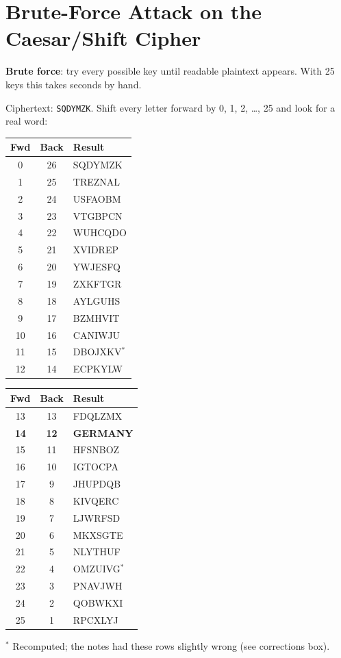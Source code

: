 \documentclass[10pt,a4paper]{article}
\newcommand{\ttx}[1]{\texttt{#1}}
\begin{document}
\section{Brute-Force Attack on the Caesar/Shift Cipher}

\begin{keybox}
\textbf{Brute force}: try every possible key until readable plaintext appears. With 25 keys this takes seconds by hand.
\end{keybox}

Ciphertext: \ttx{SQDYMZK}. Shift every letter forward by 0, 1, 2, \dots, 25 and look for a real word:

\begin{center}\small\ttfamily\setlength{\tabcolsep}{6pt}
\begin{tabular}{@{}ccl@{}}
\toprule
\rmfamily\bfseries Fwd & \rmfamily\bfseries Back & \rmfamily\bfseries Result\\
\midrule
0 & 26 & SQDYMZK\\
1 & 25 & TREZNAL\\
2 & 24 & USFAOBM\\
3 & 23 & VTGBPCN\\
4 & 22 & WUHCQDO\\
5 & 21 & XVIDREP\\
6 & 20 & YWJESFQ\\
7 & 19 & ZXKFTGR\\
8 & 18 & AYLGUHS\\
9 & 17 & BZMHVIT\\
10 & 16 & CANIWJU\\
11 & 15 & DBOJXKV$^\ast$\\
12 & 14 & ECPKYLW\\
\bottomrule
\end{tabular}
\qquad
\begin{tabular}{@{}ccl@{}}
\toprule
\rmfamily\bfseries Fwd & \rmfamily\bfseries Back & \rmfamily\bfseries Result\\
\midrule
13 & 13 & FDQLZMX\\
\rowcolor{warn!18} \textbf{14} & \textbf{12} & \textbf{GERMANY}\\
15 & 11 & HFSNBOZ\\
16 & 10 & IGTOCPA\\
17 & 9 & JHUPDQB\\
18 & 8 & KIVQERC\\
19 & 7 & LJWRFSD\\
20 & 6 & MKXSGTE\\
21 & 5 & NLYTHUF\\
22 & 4 & OMZUIVG$^\ast$\\
23 & 3 & PNAVJWH\\
24 & 2 & QOBWKXI\\
25 & 1 & RPCXLYJ\\
\bottomrule
\end{tabular}
\end{center}
{\footnotesize $^\ast$ Recomputed; the notes had these rows slightly wrong (see corrections box).}
\end{document}
